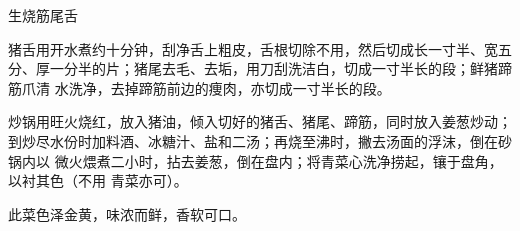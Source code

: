 %
%
%
%
%
%
%
\begin{recipe}{生烧筋尾舌}

\ingredients


\preparation

\step 猪舌用开水煮约十分钟，刮净舌上粗皮，舌根切除不用，然后切成长一寸半、宽五
分、厚一分半的片；猪尾去毛、去垢，用刀刮洗洁白，切成一寸半长的段；鲜猪蹄筋爪清
水洗净，去掉蹄筋前边的痩肉，亦切成一寸半长的段。

\step 炒锅用旺火烧红，放入猪油，倾入切好的猪舌、猪尾、蹄筋，同时放入姜葱炒动；
到炒尽水份时加料酒、冰糖汁、盐和二汤；再烧至沸时，撇去汤面的浮沫，倒在砂锅内以
微火煨煮二小时，拈去姜葱，倒在盘内；将青菜心洗净捞起，镶于盘角，以衬其色（不用
青菜亦可）。

\features

此菜色泽金黄，味浓而鲜，香软可口。

\end{recipe}

